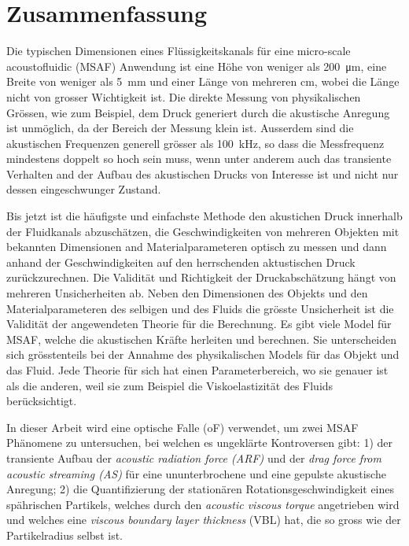\chapter*{Zusammenfassung}

Die typischen Dimensionen eines Flüssigkeitskanals für eine micro-scale 
acoustofluidic (MSAF) Anwendung ist eine Höhe von weniger als \SI{200}{\um}, 
eine Breite von weniger als \SI{5}{\mm} und einer Länge von mehreren \si{\cm}, 
wobei die Länge nicht von grosser Wichtigkeit ist. Die direkte Messung von 
physikalischen Grössen, wie zum Beispiel, dem Druck generiert durch die 
akustische Anregung ist unmöglich, da der Bereich der Messung klein ist.  
Ausserdem sind die akustischen Frequenzen generell grösser als 
\SI{100}{\kilo\hertz}, so dass die Messfrequenz mindestens doppelt so hoch sein 
muss, wenn unter anderem auch das transiente Verhalten and der Aufbau des 
akustischen Drucks von Interesse ist und nicht nur dessen eingeschwunger 
Zustand.

Bis jetzt ist die häufigste und einfachste Methode den akustichen Druck 
innerhalb der Fluidkanals abzuschätzen, die Geschwindigkeiten von mehreren 
Objekten mit bekannten Dimensionen and Materialparameteren optisch zu messen 
und dann anhand der Geschwindigkeiten auf den herrschenden aktustischen Druck 
zurückzurechnen. Die Validität und Richtigkeit der Druckabschätzung hängt von 
mehreren Unsicherheiten ab. Neben den Dimensionen des Objekts und den 
Materialparameteren des selbigen und des Fluids die grösste Unsicherheit ist 
die Validität der angewendeten Theorie für die Berechnung. Es gibt viele Model 
für MSAF, welche die akustischen Kräfte herleiten und berechnen. Sie 
unterscheiden sich grösstenteils bei der Annahme des physikalischen Models für 
das Objekt und das Fluid. Jede Theorie für sich hat einen Parameterbereich, wo 
sie genauer ist als die anderen, weil sie zum Beispiel die Viskoelastizität des 
Fluids berücksichtigt.

In dieser Arbeit wird eine optische Falle (oF) verwendet, um zwei MSAF 
Phänomene zu untersuchen, bei welchen es ungeklärte Kontroversen gibt: 1) der 
transiente Aufbau der \emph{acoustic radiation force (ARF)} und der \emph{drag 
force from acoustic streaming (AS)} für eine ununterbrochene und eine gepulste 
akustische Anregung; 2) die Quantifizierung der stationären 
Rotationsgeschwindigkeit eines spährischen Partikels, welches durch den 
\emph{acoustic viscous torque} angetrieben wird und welches eine \emph{viscous 
boundary layer thickness} (VBL) hat, die so gross wie der Partikelradius selbst 
ist.


